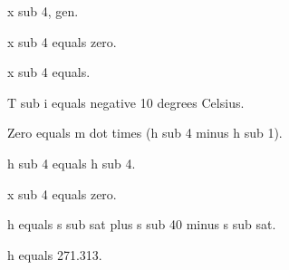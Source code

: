 x sub 4, gen.

x sub 4 equals zero.

x sub 4 equals.

T sub i equals negative 10 degrees Celsius.

Zero equals m dot times (h sub 4 minus h sub 1).

h sub 4 equals h sub 4.

x sub 4 equals zero.

h equals s sub sat plus s sub 40 minus s sub sat.

h equals 271.313.